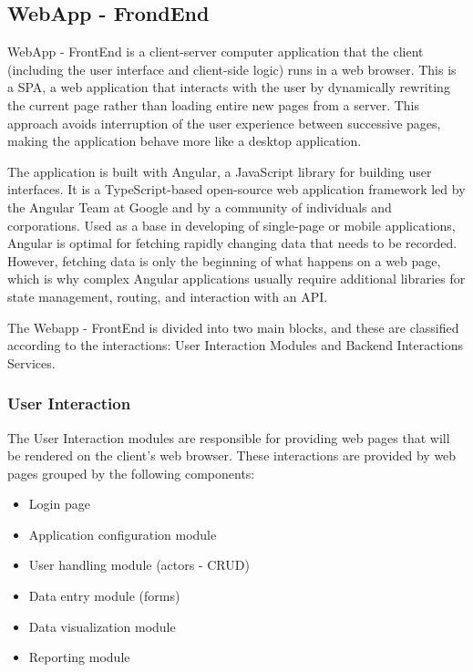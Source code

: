 \subsection{WebApp - FrondEnd}\label{sec:WebAppFrondEnd}
WebApp - FrontEnd is a client-server computer application that the client (including the user interface and client-side logic) runs in a web browser. This is a \ac{SPA}, a web application that interacts with the user by dynamically rewriting the current page rather than loading entire new pages from a server. This approach avoids interruption of the user experience between successive pages, making the application behave more like a desktop application.

The application is built with Angular, a JavaScript library for building user interfaces. It is a TypeScript-based open-source web application framework led by the Angular Team at Google and by a community of individuals and corporations. Used as a base in developing of single-page or mobile applications, Angular is optimal for fetching rapidly changing data that needs to be recorded. However, fetching data is only the beginning of what happens on a web page, which is why complex Angular applications usually require additional libraries for state management, routing, and interaction with an API.

The Webapp - FrontEnd is divided into two main blocks, and these are classified according to the interactions: User Interaction Modules and Backend Interactions Services.

\subsubsection{User Interaction}\label{sec:UserInteraction}
The User Interaction modules are responsible for providing web pages that will be rendered on the client's web browser. These interactions are provided by web pages grouped by the following components:

\begin{itemize}
\item Login page
\item Application configuration module
\item User handling module (actors - CRUD)
\item Data entry module (forms)
\item Data visualization module
\item Reporting module
\end{itemize}

